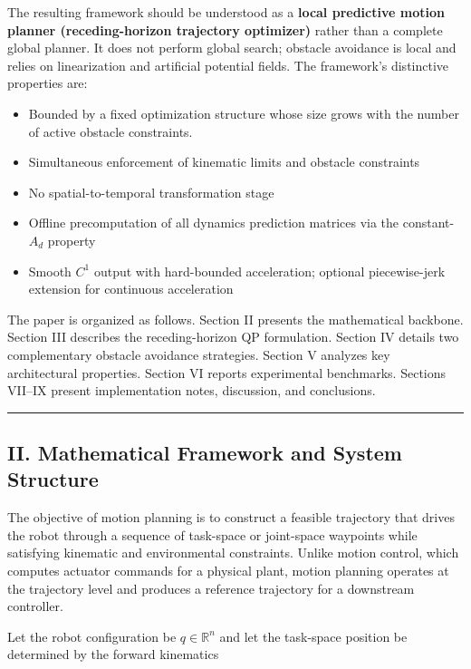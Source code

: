 The resulting framework should be understood as a \textbf{local
predictive motion planner (receding-horizon trajectory optimizer)}
rather than a complete global planner. It does not perform global
search; obstacle avoidance is local and relies on linearization and
artificial potential fields. The framework's distinctive properties are:

\begin{itemize}
\tightlist
\item
  Bounded by a fixed optimization structure whose size grows with the
  number of active obstacle constraints.
\item
  Simultaneous enforcement of kinematic limits and obstacle constraints
\item
  No spatial-to-temporal transformation stage
\item
  Offline precomputation of all dynamics prediction matrices via the
  constant-\(A_d\) property
\item
  Smooth \(C^1\) output with hard-bounded acceleration; optional
  piecewise-jerk extension for continuous acceleration
\end{itemize}

The paper is organized as follows. Section II presents the mathematical
backbone. Section III describes the receding-horizon QP formulation.
Section IV details two complementary obstacle avoidance strategies.
Section V analyzes key architectural properties. Section VI reports
experimental benchmarks. Sections VII--IX present implementation notes,
discussion, and conclusions.

\begin{center}\rule{0.5\linewidth}{0.5pt}\end{center}

\subsection{II. Mathematical Framework and System
Structure}\label{ii.-mathematical-framework-and-system-structure}

The objective of motion planning is to construct a feasible trajectory
that drives the robot through a sequence of task-space or joint-space
waypoints while satisfying kinematic and environmental constraints.
Unlike motion control, which computes actuator commands for a physical
plant, motion planning operates at the trajectory level and produces a
reference trajectory for a downstream controller.

Let the robot configuration be \(q \in \mathbb{R}^n\) and let the
task-space position be determined by the forward kinematics

